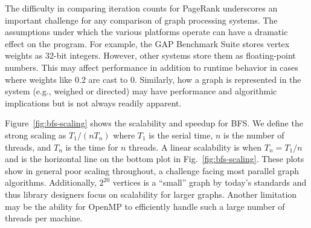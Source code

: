\documentclass{llncs}
\begin{document}
The difficulty in comparing iteration counts for PageRank underscores an important challenge for any comparison of graph processing systems. The assumptions under which the various platforms operate can have a dramatic effect on the program. For example, the GAP Benchmark Suite stores vertex weights as 32-bit integers. However, other systems store them as floating-point numbers. This may affect performance in addition to runtime behavior in cases where weights like $0.2$ are cast to $0$. Similarly, how a graph is represented in the system (e.g., weighed or directed) may have performance and algorithmic implications but is not always readily apparent.

Figure~\ref{fig:bfs-scaling} shows the scalability and speedup for BFS. We define the strong scaling as $T_1 / (n T_n)$ where $T_1$ is the serial time, $n$ is the number of threads, and $T_n$ is the time for $n$ threads. A linear scalability is when $T_n = T_1/n$ and is the horizontal line on the bottom plot in Fig.~\ref{fig:bfs-scaling}. These plots show in general poor scaling throughout, a challenge facing most parallel graph algorithms. Additionally, $2^{20}$ vertices is a ``small'' graph by today's standards and thus library designers focus on scalability for larger graphs. Another limitation may be the ability for OpenMP to efficiently handle such a large number of threads per machine.
\end{document}
